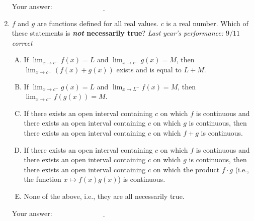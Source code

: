 \documentclass[10pt]{amsart}
\begin{document}
\begin{enumerate}
  \vspace{0.1in}
  Your answer: $\underline{\qquad\qquad\qquad\qquad\qquad\qquad\qquad}$
  \vspace{0.5in}

\item $f$ and $g$ are functions defined for all real values. $c$ is a
  real number. Which of these statements is {\bf {\em not} necessarily
  true}? {\em Last year's performance: $9/11$ correct}

  \begin{enumerate}[(A)]
  \item If $\lim_{x \to c^-} f(x) = L$ and $\lim_{x \to c^-} g(x) =
    M$, then $\lim_{x \to c^-} (f(x) + g(x))$ exists and is equal to
    $L + M$.
  \item If $\lim_{x \to c^-} g(x) = L$ and $\lim_{x \to L^-} f(x) =
    M$, then $\lim_{x \to c^-} f(g(x)) = M$.
  \item If there exists an open interval containing $c$ on which $f$
    is continuous and there exists an open interval containing $c$
    on which $g$ is continuous, then there exists an open interval
    containing $c$ on which $f + g$ is continuous.
  \item If there exists an open interval containing $c$ on which $f$
    is continuous and there exists an open interval containing $c$ on
    which $g$ is continuous, then there exists an open interval
    containing $c$ on which the product $f \cdot g$ (i.e., the
    function $x \mapsto f(x)g(x)$) is continuous.
  \item None of the above, i.e., they are all necessarily true.
  \end{enumerate}

  \vspace{0.1in}
  Your answer: $\underline{\qquad\qquad\qquad\qquad\qquad\qquad\qquad}$
  \vspace{0.5in}


\end{enumerate}
\end{document}

